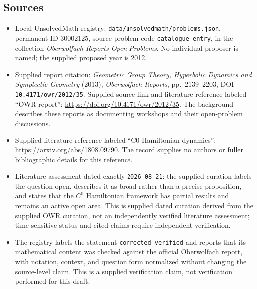 \documentclass[11pt]{article}
\begin{document}
\subsection{Sources}
\begin{itemize}
\item Local UnsolvedMath registry: \texttt{data/unsolvedmath/problems.json}, permanent ID \(30002125\), source problem code \texttt{catalogue entry}, in the collection \emph{Oberwolfach Reports Open Problems}. No individual proposer is named; the supplied proposed year is 2012.
\item Supplied report citation: \emph{Geometric Group Theory, Hyperbolic Dynamics and Symplectic Geometry} (2013), \emph{Oberwolfach Reports}, pp.~2139--2203, DOI \texttt{10.4171/owr/2012/35}. Supplied source link and literature reference labeled ``OWR report'': \url{https://doi.org/10.4171/owr/2012/35}. The background describes these reports as documenting workshops and their open-problem discussions.
\item Supplied literature reference labeled ``C0 Hamiltonian dynamics'': \url{https://arxiv.org/abs/1808.09790}. The record supplies no authors or fuller bibliographic details for this reference.
\item Literature assessment dated exactly \texttt{2026-08-21}: the supplied curation labels the question open, describes it as broad rather than a precise proposition, and states that the \(C^0\) Hamiltonian framework has partial results and remains an active open area. This is supplied dated curation derived from the supplied OWR curation, not an independently verified literature assessment; time-sensitive status and cited claims require independent verification.
\item The registry labels the statement \texttt{corrected\_verified} and reports that its mathematical content was checked against the official Oberwolfach report, with notation, context, and question form normalized without changing the source-level claim. This is a supplied verification claim, not verification performed for this draft.
\end{itemize}
\end{document}
